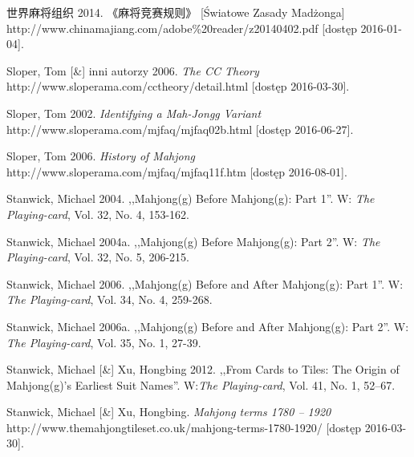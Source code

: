  世界麻将组织 2014. 《麻将竞赛规则》 [Światowe Zasady Madżonga]
\\http://www.chinamajiang.com/adobe\%20reader/z20140402.pdf [dostęp 2016-01-04].

Sloper, Tom [\&] inni autorzy 2006. \textit{The CC Theory}
\\http://www.sloperama.com/cctheory/detail.html [dostęp
2016-03-30].

Sloper, Tom 2002. \textit{Identifying a Mah-Jongg Variant}
\\http://www.sloperama.com/mjfaq/mjfaq02b.html [dostęp
2016-06-27].

Sloper, Tom 2006. \textit{History of Mahjong}
\\http://www.sloperama.com/mjfaq/mjfaq11f.htm [dostęp 2016-08-01].

Stanwick, Michael 2004. ,,Mahjong(g) Before Mahjong(g): Part 1''. W:
\textit{The Playing-card}, Vol. 32, No. 4, 153-162.

Stanwick, Michael 2004a. ,,Mahjong(g) Before Mahjong(g): Part 2''. W:
\textit{The Playing-card}, Vol. 32, No. 5, 206-215.

Stanwick, Michael 2006. ,,Mahjong(g) Before and After Mahjong(g): Part 1''. W:
\textit{The Playing-card}, Vol. 34, No. 4, 259-268.

Stanwick, Michael 2006a. ,,Mahjong(g) Before and After Mahjong(g): Part 2''. W:
\textit{The Playing-card}, Vol. 35, No. 1, 27-39.


Stanwick, Michael [\&] Xu, Hongbing 2012. ,,From Cards to Tiles: The Origin of
\mbox{Mahjong(g)'s} Earliest Suit Names''. W:\textit{The Playing-card}, Vol. 41,
No.
1, 52–67.

Stanwick, Michael [\&] Xu, Hongbing. \textit{Mahjong terms 1780 – 1920}
\\http://www.themahjongtileset.co.uk/mahjong-terms-1780-1920/ [dostęp
2016-03-30].

